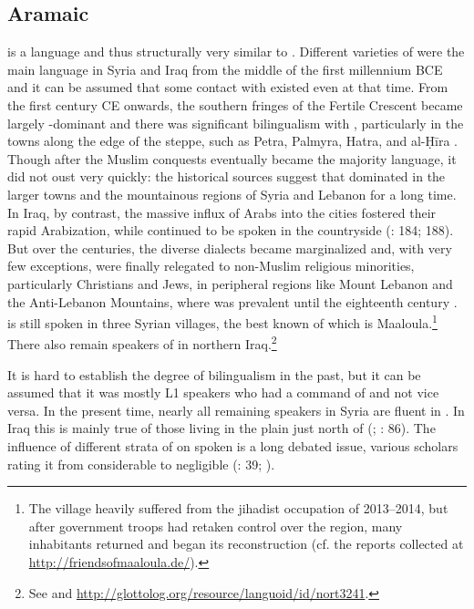 \documentclass[output=paper]{langsci/langscibook}
\begin{document}
  \subsection{Aramaic} \label{aram}
 is a  language and thus structurally very similar to . Different varieties of  were the main language in Syria and Iraq from the middle of the first millennium BCE and it can be assumed that some contact with  existed even at that time. From the first century CE onwards, the southern fringes of the Fertile Crescent became largely -dominant and there was significant {bilingualism} with , particularly in the towns along the edge of the steppe, such as Petra, Palmyra, Hatra, and al-Ḥīra \citep[260--262]{Procházka2018Fertile}. Though after the Muslim conquests  eventually became the majority language, it did not oust  very quickly: the historical sources suggest that  dominated in the larger towns and the mountainous regions of Syria and Lebanon for a long time. In Iraq, by contrast, the massive influx of Arabs into the cities fostered their rapid {Arabization}, while  continued to be spoken in the countryside (\citealt{Magidow2013}: 184; 188). But over the centuries, the diverse  dialects became marginalized and, with very few exceptions, were finally relegated to non-Muslim religious minorities, particularly {Christians} and {Jews}, in peripheral regions like Mount Lebanon and the Anti-Lebanon Mountains, where  was prevalent until the eighteenth century \citep{Retsö2011}.  is still spoken in three Syrian villages, the best known of which is Maaloula.\footnote{The village heavily suffered from the jihadist occupation of 2013--2014, but after government troops had retaken control over the region, many inhabitants returned and began its reconstruction (cf. the reports collected at \url{http://friendsofmaaloula.de/}).} There also remain speakers of  in northern Iraq.\footnote{See \citet{Coghill2012} and \url{http://glottolog.org/resource/languoid/id/nort3241}.} 

It is hard to establish the degree of {bilingualism} in the past, but it can be assumed that it was mostly  L1 speakers who had a command of  and not vice versa. In the present time, nearly all remaining  speakers in Syria are fluent in . In Iraq this is mainly true of those living in the plain just north of  (\citealt{ArnoldBehnstedt1993}; \citealt{Coghill2012}: 86). The influence of different strata of  on spoken  is a long debated issue, various scholars rating it from considerable to negligible (\citealt{Hopkins1995}: 39; \citealt{Lentin2018}).
\end{document}
